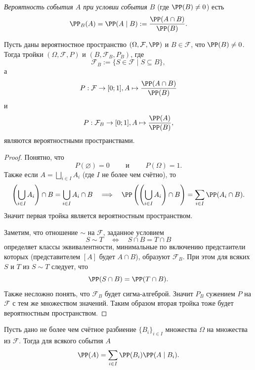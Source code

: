 \documentclass[12pt,a4paper]{article}
\begin{document}
    \begin{definition}
        \emph{Вероятность события $A$ при условии события $B$} (где $\PP(B) \neq 0$) есть
        \[\PP_B(A) = \PP(A \mid B) := \frac{\PP(A \cap B)}{\PP(B)}.\]
    \end{definition}

    \begin{theorem}
        Пусть даны вероятностное пространство $(\Omega, \mathcal{F}, \PP)$ и $B \in \mathcal{F}$, что $\PP(B) \neq 0$. Тогда тройки $(\Omega, \mathcal{F}, P)$ и $(B, \mathcal{F}_B, P_B)$, где
        \[\mathcal{F}_B := \{S \in \mathcal{F} \mid S \subseteq B\},\]
        а
        \[P: \mathcal{F} \to [0; 1], A \mapsto \frac{\PP(A \cap B)}{\PP(B)}\]
        и
        \[P: \mathcal{F}_B \to [0; 1], A \mapsto \frac{\PP(A)}{\PP(B)},\]
        являются вероятностными пространствами.
    \end{theorem}

    \begin{proof}
        Понятно, что
        \[P(\varnothing) = 0 \qquad \text{ и } \qquad P(\Omega) = 1.\]
        Также если $A = \bigsqcup_{i \in I} A_i$ (где $I$ не более чем счётно), то
        \[
            \left(\bigcup_{i \in I} A_i \right) \cap B = \bigcup_{i \in I} A_i \cap B
            \quad \Longrightarrow \quad
            \PP\left(\left(\bigcup_{i \in I} A_i \right) \cap B\right) = \sum_{i \in I} \PP(A_i \cap B).
        \]
        Значит первая тройка является вероятностным пространством.

        Заметим, что отношение $\sim$ на $\mathcal{F}$, заданное условием
        \[S \sim T \quad \Longleftrightarrow \quad S \cap B = T \cap B\]
        определяет классы эквивалентности, минимальные по включению предстаители которых (представителем $[A]$ будет $A \cap B$), образуют $\mathcal{F}_B$. При этом для всяких $S$ и $T$ из $S \sim T$ следует, что
        \[\PP(S \cap B) = \PP(T \cap B).\]
        Также несложно понять, что $\mathcal{F}_B$ будет сигма-алгеброй. Значит $P_B$ сужением $P$ на $\mathcal{F}$ с тем же множеством значений. Таким образом вторая тройка тоже будет вероятностным пространством.
    \end{proof}

    \begin{lemma}
        Пусть дано не более чем счётное разбиение $\{B_i\}_{i \in I}$ множества $\Omega$ на множества из $\mathcal{F}$. Тогда для всякого события $A$
        \[\PP(A) = \sum_{i \in I} \PP(B_i) \PP(A \mid B_i).\]
    \end{lemma}
\end{document}

